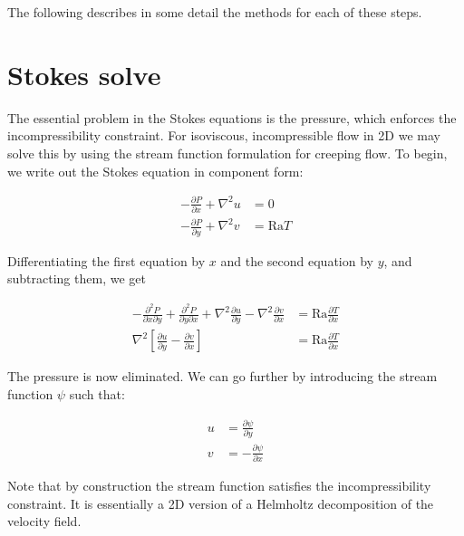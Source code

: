 \documentclass[a4paper,10pt]{article}
\begin{document}
The following describes in some detail the methods for each of these steps.

\section{Stokes solve}

The essential problem in the Stokes equations is the pressure, which enforces the incompressibility constraint.
For isoviscous, incompressible flow in 2D we may solve this by using the stream function formulation for creeping flow.
To begin, we write out the Stokes equation in component form:

\begin{equation}
\begin{aligned}
-\frac{\partial P}{\partial x} + \nabla^2 u &= 0 \\
-\frac{\partial P}{\partial y} + \nabla^2 v &= \mathrm{Ra} T
\end{aligned}
\end{equation} 

Differentiating the first equation by $x$ and the second equation by $y$, and subtracting them, we get

\begin{equation}
\begin{aligned}
-\frac{\partial^2 P}{\partial x \partial y} + \frac{\partial^2 P}{\partial y \partial x}  + \nabla^2 \frac{\partial u}{\partial y} - \nabla^2 \frac{\partial v}{\partial x} &= \mathrm{Ra} \frac{\partial{T}}{\partial x} \\
\nabla^2 \left[ \frac{\partial u}{\partial y} - \frac{\partial v}{\partial x} \right] &= \mathrm{Ra} \frac{\partial{T}}{\partial x}
\end{aligned}
\end{equation} 

The pressure is now eliminated.  We can go further by introducing the stream function $\psi$ such that:

\begin{equation}
\begin{aligned}
u &= \frac{\partial \psi}{\partial y} \\
v &= -\frac{\partial \psi}{\partial x}
\end{aligned}
\end{equation}

Note that by construction the stream function satisfies the incompressibility constraint.  It is essentially a 2D version of a Helmholtz decomposition of the velocity field.
\end{document}
